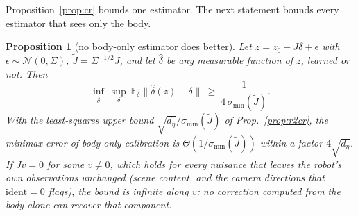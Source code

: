 \documentclass{article}
\newtheorem{proposition}{Proposition}
\newcommand{\ident}{\mathrm{ident}}
\begin{document}
Proposition~\ref{prop:cr} bounds one estimator. The next statement bounds every estimator that sees only the body.

\begin{proposition}[no body-only estimator does better]
\label{prop:minimax}
Let $z = z_0 + J\delta + \epsilon$ with $\epsilon \sim \mathcal N(0,\Sigma)$, $\tilde J = \Sigma^{-1/2}J$, and let
$\hat\delta$ be any measurable function of $z$, learned or not. Then
\begin{equation}
\inf_{\hat\delta}\ \sup_{\delta}\ \mathbb{E}_\delta\|\hat\delta(z) - \delta\| \ \ge\ \frac{1}{4\,\sigma_{\min}(\tilde J)}.
\label{eq:minimax}
\end{equation}
With the least-squares upper bound $\sqrt{d_\eta}/\sigma_{\min}(\tilde J)$ of Prop.~\ref{prop:r2cr}, the minimax error of
body-only calibration is $\Theta(1/\sigma_{\min}(\tilde J))$ within a factor $4\sqrt{d_\eta}$. If $J v = 0$ for some $v \ne
0$, which holds for every nuisance that leaves the robot's own observations unchanged (scene content, and the camera
directions that $\ident = 0$ flags), the bound is infinite along $v$: no correction computed from the body alone can
recover that component.
\end{proposition}
\end{document}
